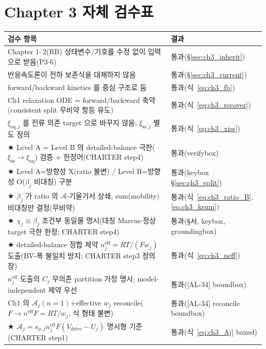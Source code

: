 \documentclass[11pt,a4paper]{article}
\newcommand{\eff}{\mathrm{eff}}
\newcommand{\eq}{\mathrm{eq}}
\newcommand{\drive}{\mathrm{drive}}
\newcommand{\sstat}{\mathrm{ss}}
\newcommand{\AL}[1]{\textsf{[AL-#1]}}
\begin{document}
\section{Chapter 3 자체 검수표}\label{sec:ch3_selfcheck}
{\small
\begin{longtable}{>{\raggedright\arraybackslash}p{} >{\raggedright\arraybackslash}p{}}
\toprule 검수 항목 & 결과 \\ \midrule \endhead
Chapter 1--2(RB) 상태변수/기호를 수정 없이 입력으로 받음(P3-6) & 통과(\S\ref{sec:ch3_inherit}) \\
반응속도론이 전하 보존식을 대체하지 않음 & 통과(\S\ref{sec:ch3_current}) \\
forward/backward kinetics 를 중심 구조로 둠 & 통과(식~\eqref{eq:ch3_fb}) \\
Ch1 relaxation ODE = forward/backward 축약(consistent split 무비약 항등 유도) & 통과(식~\eqref{eq:ch3_recover}) \\
$\xi_{\eq,j}$ 를 전류 의존 target 으로 바꾸지 않음; $\xi_{\sstat,j}$ 별도 정의 & 통과(식~\eqref{eq:ch3_xiss}) \\
★ Level A = Level B 의 detailed-balance 극한($\xi_\sstat\to\xi_\eq$) 검증 + 한정어(CHARTER step4) & 통과(verifybox) \\
★ Level A=방향성 X(ratio 불변) / Level B=방향성 O($\beta_j$ 비대칭) 구분 & 통과(keybox \S\ref{sec:ch3_split}) \\
★ $\beta_j$ 가 ratio 의 $\mathcal A$-기울기서 상쇄, sum(mobility) 비대칭만 결정(무비약) & 통과(식~\eqref{eq:ch3_ratio_B},\allowbreak\eqref{eq:ch3_ksum}) \\
★ $\chi_j\equiv\beta_j$ 조건부 동일물 명시(대칭 Marcus$\cdot$정상 target 극한 한정; CHARTER step4) & 통과(\S 서, keybox, groundingbox) \\
★ detailed-balance 정합 제약 $n_j^{\eff}=RT/(Fw_j)$ 도출(BV-폭 불일치 방지; CHARTER step3 정의장) & 통과(식~\eqref{eq:ch3_neff}) \\
$n_j^{\eff}$ 도출의 $C_j$ 무의존 partition 가정 명시; model-independent 제약 우선 & 통과(\AL{34} boundbox) \\
Ch1 의 $\mathcal A_j(n{=}1)$+effective $w_j$ reconcile($F\to n^\eff F=RT/w_j$, 식 형태 불변) & 통과(\AL{34} reconcile boundbox) \\
★ $\mathcal A_j=s_{\phi,j}n_j^\eff F(V_\drive-U_j)$ 명시형 기준(CHARTER step1) & 통과(식~\eqref{eq:ch3_Aj} boxed) \\

\end{longtable}}
\end{document}
